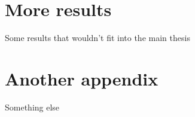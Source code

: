 \documentclass[
  a4paper,
  headsepline=true,
  open=any]{scrbook}
\begin{document}
\cleardoublepage
{}
{}
\appendix

\hypertarget{sec-more-results}{%
\chapter{More results}\label{sec-more-results}}

Some results that wouldn't fit into the main thesis

\hypertarget{another-appendix}{%
\chapter{Another appendix}\label{another-appendix}}

Something else


\backmatter
\end{document}

